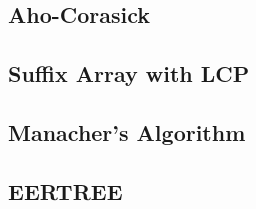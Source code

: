 \documentclass[9pt,landscape,a4paper,twocolumn]{extarticle}
\begin{document}
\subsection{Aho-Corasick}


\subsection{Suffix Array with LCP}


\subsection{Manacher's Algorithm}


\subsection{EERTREE}

\end{document}
